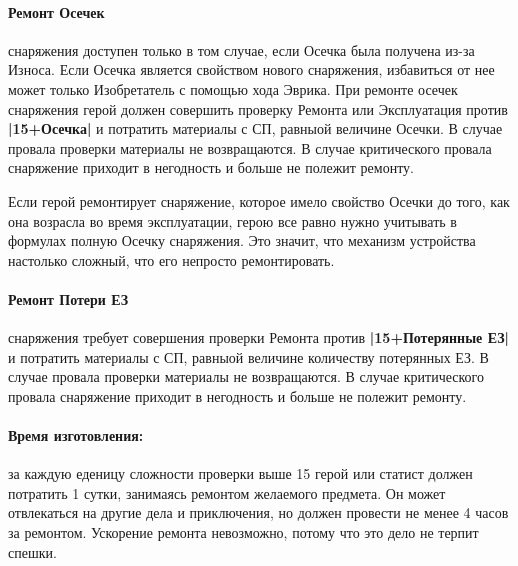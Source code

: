 \paragraph{Ремонт Осечек} снаряжения доступен только в том случае, если Осечка была получена из-за Износа. Если Осечка является свойством нового снаряжения, избавиться от нее может только Изобретатель с помощью хода Эврика.
\newline
При ремонте осечек снаряжения герой должен совершить проверку Ремонта или Эксплуатация против \textbf{|15+Осечка|} и потратить материалы с СП, равныой величине Осечки. В случае провала проверки материалы не возвращаются. В случае критического провала снаряжение приходит в негодность и больше не полежит ремонту.
\begin{tcolorbox}
Если герой ремонтирует снаряжение, которое имело свойство Осечки до того, как она возрасла во время эксплуатации, герою все равно нужно учитывать в формулах полную Осечку снаряжения. Это значит, что механизм устройства настолько сложный, что его непросто ремонтировать.
\end{tcolorbox}
\paragraph{Ремонт Потери ЕЗ} снаряжения требует совершения проверки Ремонта против \textbf{|15+Потерянные ЕЗ|} и потратить материалы с СП, равныой величине количеству потерянных ЕЗ. В случае провала проверки материалы не возвращаются. В случае критического провала снаряжение приходит в негодность и больше не полежит ремонту.
\paragraph{Время изготовления:} за каждую еденицу сложности проверки выше 15 герой или статист должен потратить 1 сутки, занимаясь ремонтом желаемого предмета. Он может отвлекаться на другие дела и приключения, но должен провести не менее 4 часов за ремонтом. Ускорение ремонта невозможно, потому что это дело не терпит спешки.
